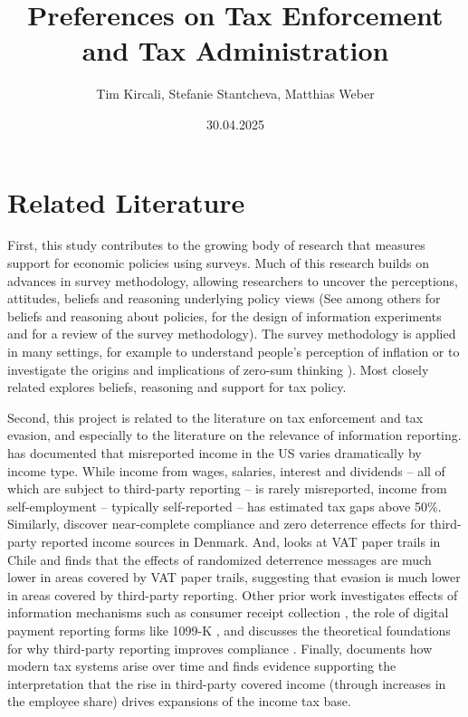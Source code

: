 \documentclass[12pt]{article}
\title{\textbf{\large{Preferences on Tax Enforcement and Tax Administration}}}
\author{\normalsize{Tim Kircali, Stefanie Stantcheva, Matthias Weber}}
\date{\normalsize{30.04.2025}}
\begin{document}
\maketitle
{}
\section*{Related Literature}
First, this study contributes to the growing body of research that measures support for economic policies using surveys. Much of this research builds on advances in survey methodology, allowing researchers to uncover the perceptions, attitudes, beliefs and reasoning underlying policy views (See among others \cite{dechezlepretre2025fighting} for beliefs and reasoning about policies, \cite{haaland2023designing} for the design of information experiments and \cite{stantcheva2023run} for a review of the survey methodology). The survey methodology is applied in many settings, for example to understand people's perception of inflation  \parencite{binetti2024people} or to investigate the origins and implications of zero-sum thinking  \parencite{NBERw31688}). Most closely related \textcite{stantcheva2021understanding} explores beliefs, reasoning and support for tax policy.

Second, this project is related to the literature on tax enforcement and tax evasion, and especially to the literature on the relevance of information reporting. \textcite{slemrod2007cheating} has documented that misreported income in the US varies dramatically by income type. While income from wages, salaries, interest and dividends -- all of which are subject to third-party reporting -- is rarely misreported, income from self-employment -- typically self-reported -- has estimated tax gaps above 50\%. Similarly, \textcite{kleven2011unwilling} discover near-complete compliance and zero deterrence effects for third-party reported income sources in Denmark. And, \textcite{pomeranz2015no} looks at VAT paper trails in Chile and finds that the effects of randomized deterrence messages are much lower in areas covered by VAT paper trails, suggesting that evasion is much lower in areas covered by third-party reporting. Other prior work investigates effects of information mechanisms such as consumer receipt collection \parencite{naritomi2019consumers}, the role of digital payment reporting forms like 1099-K \parencite{slemrod2017does}, and discusses the theoretical foundations for why third-party reporting improves compliance \parencite{kleven2016can}. Finally, \textcite{jensen2022employment} documents how modern tax systems arise over time and finds evidence supporting the interpretation that the rise in third-party covered income (through increases in the employee share) drives expansions of the income tax base.
\end{document}
